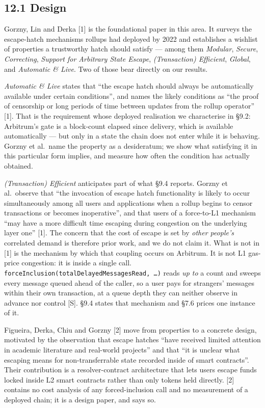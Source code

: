 \documentclass[conference]{IEEEtran}
\renewcommand{\_}{\textunderscore\allowbreak}
\begin{document}
\subsection{12.1 Design}\label{design}

Gorzny, Lin and Derka {[}1{]} is the foundational paper in this area. It
surveys the escape-hatch mechanisms rollups had deployed by 2022 and
establishes a wishlist of properties a trustworthy hatch should satisfy
--- among them \emph{Modular}, \emph{Secure}, \emph{Correcting},
\emph{Support for Arbitrary State Escape}, \emph{(Transaction)
Efficient}, \emph{Global}, and \emph{Automatic \& Live}. Two of those
bear directly on our results.

\emph{Automatic \& Live} states that ``the escape hatch should always be
automatically available under certain conditions'', and names the likely
conditions as ``the proof of censorship or long periods of time between
updates from the rollup operator'' {[}1{]}. That is the requirement
whose deployed realisation we characterise in §9.2: Arbitrum's gate is a
block-count elapsed since delivery, which is available automatically ---
but only in a state the chain does not enter while it is behaving.
Gorzny et al.~name the property as a desideratum; we show what
satisfying it in this particular form implies, and measure how often the
condition has actually obtained.

\emph{(Transaction) Efficient} anticipates part of what §9.4 reports.
Gorzny et al.~observe that ``the invocation of escape hatch
functionality is likely to occur simultaneously among all users and
applications when a rollup begins to censor transactions or becomes
inoperative'', and that users of a force-to-L1 mechanism ``may have a
more difficult time escaping during congestion on the underlying layer
one'' {[}1{]}. The concern that the cost of escape is set by \emph{other
people's} correlated demand is therefore prior work, and we do not claim
it. What is not in {[}1{]} is the mechanism by which that coupling
occurs on Arbitrum. It is not L1 gas-price congestion: it is inside a
single call. \texttt{forceInclusion(\_totalDelayedMessagesRead,\ …)}
reads \emph{up to} a count and sweeps every message queued ahead of the
caller, so a user pays for strangers' messages within their own
transaction, at a queue depth they can neither observe in advance nor
control {[}S{]}. §9.4 states that mechanism and §7.6 prices one instance
of it.

Figueira, Derka, Chiu and Gorzny {[}2{]} move from properties to a
concrete design, motivated by the observation that escape hatches ``have
received limited attention in academic literature and real-world
projects'' and that ``it is unclear what escaping means for
non-transferrable state recorded inside of smart contracts''. Their
contribution is a resolver-contract architecture that lets users escape
funds locked inside L2 smart contracts rather than only tokens held
directly. {[}2{]} contains no cost analysis of any forced-inclusion call
and no measurement of a deployed chain; it is a design paper, and says
so.
\end{document}

